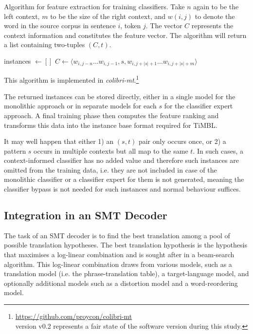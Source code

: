 \begin{algorithm}
\caption{Algorithm for feature extraction for training classifiers.  Take $n$
again to be the left context, $m$ to be the size of the right context, and
$w{(i,j)}$ to denote the word in the source corpus in sentence $i$, token $j$.
The vector $C$ represents the context information and constitutes the feature
vector.  The algorithm will return a list containing two-tuples $(C,t)$.  }
\label{alg:featureextract}
\begin{algorithmic}
\State instances $\gets []$
        \State $C \gets \langle w_{i,j-n} \ldots w_{i,j-1}, s, w_{i,j+|s|+1} \ldots w_{i,j+|s|+m} \rangle$
        \State {}
      \EndFor
  \EndFor
\EndFor \\
\end{algorithmic}
\end{algorithm}

\noindent
This algorithm is implemented in \emph{colibri-mt}.\footnote{\url{https://github.com/proycon/colibri-mt} \\ version v0.2 represents a fair state of the software version during this study.}

The returned instances can be stored directly, either in a single model for the
monolithic approach or in separate models for each $s$ for the classifier
expert approach. A final training phase then computes the feature ranking and
transforms this data into the instance base format required for TiMBL.

It may well happen that either 1) an $(s,t)$ pair only occurs once, or
2) a pattern $s$ occurs in multiple contexts but all map to the same
$t$. In such cases, a context-informed classifier has no added value
and therefore such instances are omitted from the training data, i.e. they are not included in case of the monolithic
classifier or a classifier expert for them is not generated, meaning the classifier bypass is not needed for such
instances and normal behaviour suffices.

\subsection{Integration in an SMT Decoder}
\label{sec:smtintegration}

The task of an SMT decoder is to find the best translation among a pool
of possible translation hypotheses. The best translation hypothesis is the
hypothesis that maximises a log-linear combination and is sought
after in a beam-search algorithm. This log-linear combination draws from
various models, such as a translation model (i.e. the phrase-translation
table), a target-language model, and optionally additional models such as a
distortion model and a word-reordering model.

